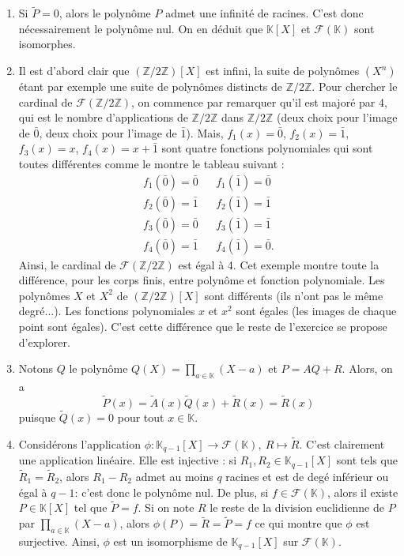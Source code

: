 \documentclass[11pt,a4paper]{article}
\begin{document}
	\begin{corrige}
		\begin{enumerate}
			
			\item  Si $\tilde P=0$, alors le polynôme $P$ admet une infinité de racines. C'est donc nécessairement le polynôme nul. On en déduit que $\mathbb K[X]$ et
			$\mathcal F(\mathbb K)$ sont isomorphes.
			
			\item  Il est d'abord clair que $(\mathbb Z/2\mathbb Z)[X]$ est infini, la suite de polynômes $(X^n)$ étant par exemple une suite de polynômes distincts de $\mathbb Z/2\mathbb Z$. Pour chercher le cardinal de $\mathcal F(\mathbb Z/2\mathbb Z)$, on commence par remarquer qu'il est majoré par 4, qui est le nombre d'applications de $\mathbb Z/2\mathbb Z$ dans $\mathbb Z/2\mathbb Z$ (deux choix pour l'image de $\bar 0$, deux choix pour l'image de $\bar 1$). Mais, $f_1(x)=\bar 0$, $f_2(x)=\bar 1$, $f_3(x)=x$, $f_4(x)=x+\bar 1$ sont quatre fonctions polynomiales qui sont toutes différentes comme le montre le tableau suivant :
			\begin{eqnarray*}
				f_1(\bar 0)=\bar 0&&f_1(\bar 1)=\bar 0\\
				f_2(\bar 0)=\bar 1&&f_2(\bar 1)=\bar 1\\
				f_3(\bar 0)=\bar 0&&f_3(\bar 1)=\bar 1\\
				f_4(\bar 0)=\bar 1&&f_4(\bar 1)=\bar 0.
			\end{eqnarray*}
			Ainsi, le cardinal de $\mathcal F(\mathbb Z/2\mathbb Z)$ est égal à 4. Cet exemple montre toute la différence, pour les corps finis, entre polynôme et fonction polynomiale. Les polynômes $X$ et $X^2$ de $(\mathbb Z/2\mathbb Z)[X]$ sont différents (ils n'ont pas le même degré...). Les fonctions polynomiales $x$ et $x^2$ sont égales (les images de chaque point sont égales). C'est cette différence que le reste de l'exercice se propose d'explorer.
			
			\item  Notons $Q$ le polynôme $Q(X)=\prod_{a\in\mathbb K}(X-a)$ et $P=AQ+R$. Alors, on a 
			$$\tilde P(x)=\tilde A(x)\tilde Q(x)+\tilde R(x)=\tilde R(x)$$
			puisque $\tilde Q(x)=0$ pour tout $x\in\mathbb K$.
			
			\item  Considérons l'application $\phi:\mathbb K_{q-1}[X]\to \mathcal F(\mathbb K),\ R\mapsto \tilde R$. C'est clairement une application linéaire. Elle est injective : si $R_1,R_2\in\mathbb K_{q-1}[X]$ sont tels que $\tilde R_1=\tilde R_2$, alors $R_1-R_2$ admet au moins $q$ racines et est de degé inférieur ou égal à $q-1$: c'est donc le polynôme nul. De plus, si $f\in\mathcal F(\mathbb K)$, alors il existe $P\in\mathbb K[X]$ tel que $\tilde P=f$. Si on note $R$ le reste de la division euclidienne de $P$ par $\prod_{a\in \mathbb K}(X-a)$, alors $\phi(P)=\tilde R=\tilde P=f$ ce qui montre que $\phi$ est surjective. Ainsi, $\phi$ est un isomorphisme de $\mathbb K_{q-1}[X]$ sur $\mathcal F(\mathbb K)$.
			
		\end{enumerate}
	\end{corrige}
	
\end{document}
